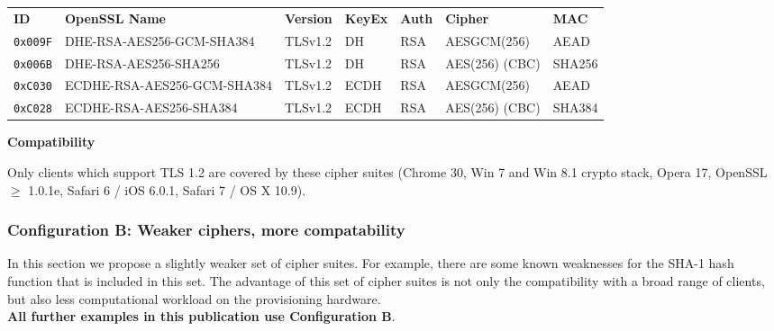 %



\begin{center}

\begin{tabular}{lllllll}
\toprule
\textbf{ID}   & \textbf{OpenSSL Name}       & \textbf{Version} & \textbf{KeyEx} & \textbf{Auth} & \textbf{Cipher} & \textbf{MAC}\\\cmidrule(lr){1-7}
\verb|0x009F| & DHE-RSA-AES256-GCM-SHA384   & TLSv1.2          & DH             &  RSA          & AESGCM(256)     & AEAD         \\
\verb|0x006B| & DHE-RSA-AES256-SHA256       & TLSv1.2          & DH             &  RSA          & AES(256) (CBC)  & SHA256       \\
\verb|0xC030| & ECDHE-RSA-AES256-GCM-SHA384 & TLSv1.2          & ECDH           &  RSA          & AESGCM(256)     & AEAD         \\
\verb|0xC028| & ECDHE-RSA-AES256-SHA384     & TLSv1.2          & ECDH           &  RSA          & AES(256) (CBC)  & SHA384       \\
\bottomrule
\end{tabular}
\end{center}


\textbf{Compatibility}

Only clients which support TLS 1.2 are covered by these cipher suites (Chrome 30,
Win 7 and Win 8.1 crypto stack, Opera 17, OpenSSL $\ge$ 1.0.1e, Safari 6 / iOS
6.0.1, Safari 7 / OS X 10.9).



\subsubsection{Configuration B: Weaker ciphers, more compatability}

In this section we propose a slightly weaker set of cipher suites.  For
example, there are some known weaknesses for the SHA-1 hash function that is
included in this set.  The advantage of this set of cipher suites is not only
the compatibility with a broad range of clients, but also less computational
workload on the provisioning hardware.
\\

\textbf{All further examples in this publication use Configuration B}.\\


